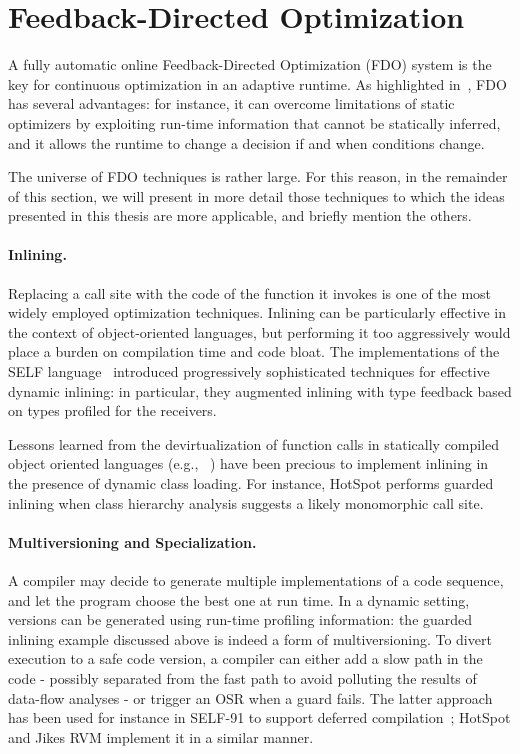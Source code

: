 \section{Feedback-Directed Optimization}
A fully automatic online Feedback-Directed Optimization (FDO) system is the key for continuous optimization in an adaptive runtime. As highlighted in~\cite{Arnold05}, FDO has several advantages: for instance, it can overcome limitations of static optimizers by exploiting run-time information that cannot be statically inferred, and it allows the runtime to change a decision if and when conditions change.

The universe of FDO techniques is rather large. For this reason, in the remainder of this section, we will present in more detail those techniques to which the ideas presented in this thesis are more applicable, and briefly mention the others.

\paragraph*{Inlining.} Replacing a call site with the code of the function it invokes is one of the most widely employed optimization techniques. Inlining can be particularly effective in the context of object-oriented languages, but performing it too aggressively would place a burden on compilation time and code bloat. The implementations of the SELF language~\cite{Holzle92,Holzle96} introduced progressively sophisticated techniques for effective dynamic inlining: in particular, they augmented inlining with type feedback based on types profiled for the receivers.

Lessons learned from the devirtualization of function calls in statically compiled object oriented languages (e.g., ~\cite{Bacon96,Dean96}) have been precious to implement inlining in the presence of dynamic class loading. For instance, HotSpot performs guarded inlining when class hierarchy analysis suggests a likely monomorphic call site.

\paragraph*{Multiversioning and Specialization.} A compiler may decide to generate multiple implementations of a code sequence, and let the program choose the best one at run time. In a dynamic setting, versions can be generated using run-time profiling information: the guarded inlining example discussed above is indeed a form of multiversioning. To divert execution to a safe code version, a compiler can either add a slow path in the code - possibly separated from the fast path to avoid polluting the results of data-flow analyses - or trigger an OSR when a guard fails. The latter approach has been used for instance in SELF-91 to support deferred compilation~\cite{Chambers91}; HotSpot and Jikes RVM implement it in a similar manner.

